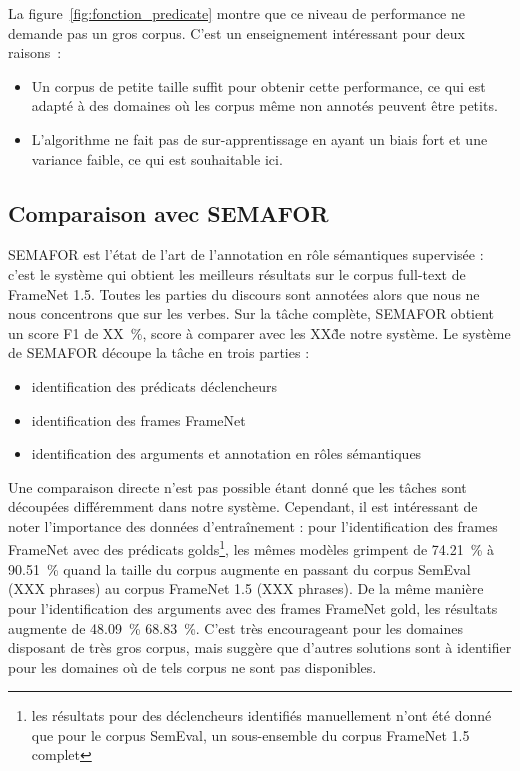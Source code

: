 La figure~\ref{fig:fonction_predicate} montre que ce niveau de performance ne
demande pas un gros corpus. C'est un enseignement intéressant pour deux
raisons~:

\begin{itemize}

    \item Un corpus de petite taille suffit pour obtenir cette performance, ce
    qui est adapté à des domaines où les corpus même non annotés peuvent être
    petits.

    \item L'algorithme ne fait pas de sur-apprentissage en ayant un biais fort
    et une variance faible, ce qui est souhaitable ici.

\end{itemize}

\subsection{Comparaison avec SEMAFOR}

SEMAFOR \citep{das2014frame} est l'état de l'art de l'annotation en rôle
sémantiques supervisée : c'est le système qui obtient les meilleurs résultats
sur le corpus full-text de FrameNet 1.5. Toutes les parties du discours sont
annotées alors que nous ne nous concentrons que sur les verbes. Sur la tâche
complète, SEMAFOR obtient un score F1 de XX~\%, score à comparer avec les XX\~
de notre système. Le système de SEMAFOR découpe la tâche en trois parties :

\begin{itemize}
    \item identification des prédicats déclencheurs
    \item identification des frames FrameNet
    \item identification des arguments et annotation en rôles sémantiques 
\end{itemize}

Une comparaison directe n'est pas possible étant donné que les tâches sont
découpées différemment dans notre système. Cependant, il est intéressant de
noter l'importance des données d'entraînement : pour l'identification des
frames FrameNet avec des prédicats golds\footnote{les résultats pour des
déclencheurs identifiés manuellement n'ont été donné que pour le corpus
SemEval, un sous-ensemble du corpus FrameNet 1.5 complet}, les mêmes modèles
grimpent de 74.21~\% à 90.51~\% quand la taille du corpus augmente en passant
du corpus SemEval (XXX phrases) au corpus FrameNet 1.5 (XXX phrases). De la
même manière pour l'identification des arguments avec des frames FrameNet gold,
les résultats augmente de 48.09~\% 68.83~\%. C'est très encourageant pour les
domaines disposant de très gros corpus, mais suggère que d'autres solutions
sont à identifier pour les domaines où de tels corpus ne sont pas disponibles.


